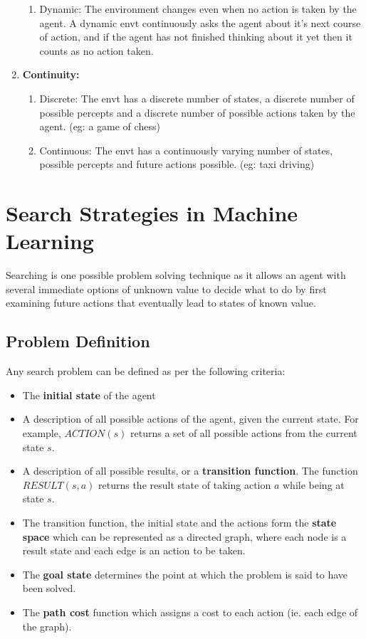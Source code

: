\documentclass{article}
\theoremstyle{plain}
\theoremstyle{definition}
\begin{document}
\begin{enumerate}
\begin{enumerate}
            \item Dynamic: The environment changes even when no action is taken by the agent. A dynamic envt continuously asks the agent about it's next course of action, and if the agent has not finished thinking about it yet then it counts as no action taken.
        \end{enumerate}
        \item \textbf{Continuity:}
        \begin{enumerate}
            \item Discrete: The envt has a discrete number of states, a discrete number of possible percepts and a discrete number of possible actions taken by the agent. (eg: a game of chess)
            \item Continuous: The envt has a continuously varying number of states, possible percepts and future actions possible. (eg: taxi driving)
        \end{enumerate}
    \end{enumerate}
    
\section{Search Strategies in Machine Learning}
Searching is one possible problem solving technique as it allows an agent with several
immediate options of unknown value to decide what to do by first examining future actions that eventually lead to states of known value.

\subsection{Problem Definition}
Any search problem can be defined as per the following criteria:
\begin{itemize}
    \item The \textbf{initial state} of the agent
    
    \item A description of all possible actions of the agent, given the current state. For example, $ACTION(s)$ returns a set of all possible actions from the current state $s$. 
    
    \item A description of all possible results, or a \textbf{transition function}. The function $RESULT(s, a)$ returns the result state of taking action $a$ while being at state $s$. 
    
    \item The transition function, the initial state and the actions form the \textbf{state space} which can be represented as a directed graph, where each node is a result state and each edge is an action to be taken.
    
    \item The \textbf{goal state} determines the point at which the problem is said to have been solved. 
    
    \item The \textbf{path cost} function which assigns a cost to each action (ie. each edge of the graph). 
\end{itemize}
\end{document}
